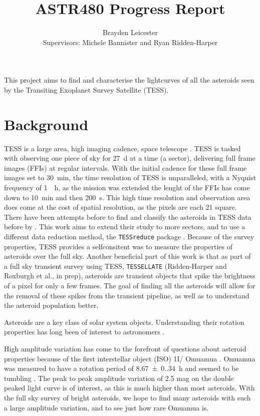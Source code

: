\documentclass[12pt]{article}
\title{ASTR480 Progress Report}
\author{Brayden Leicester \\[1ex]
\small{Supervisors: Michele Bannister and Ryan Ridden-Harper}
}
\DeclareRobustCommand{\okina}{%
  \raisebox{\dimexpr\fontcharht\font`A-\height}{%
    \scalebox{0.8}{`}%
  }%
}
\newcommand{\omuamua}{\okina Omuamua }
\begin{document}
\maketitle


This project aims to find and characterise the lightcurves of all the asteroids seen by the Transiting Exoplanet Survey Satellite (TESS). 
\section{Background}
TESS is a large area, high imaging cadence, space telescope  \citep{Ricker2014}. 
TESS is tasked with observing one piece of sky for \qty{27}{\day} at a time (a sector), delivering  full frame images (FFIs) at regular intervals. 
With the initial cadence for these full frame images set to \qty{30}{\minute}, the time resolution of TESS is unparalleled, with a Nyquist frequency of \qty{1}{\per\hour}, as the mission was extended the lenght of the FFIs has come down to \qty{10}{\minute} and then \qty{200}{\second}. 
This high time resolution and observation area does come at the cost of spatial resolution, as the pixels are each \qty{21}{\arcsec} square.
There have been attempts before to find and classify the asteroids in TESS data before by \citet{Pal2018, Pal2020}. This work aims to extend their study to more sectors, and to use a different data reduction method, the \texttt{TESSreduce} package \citep{Ridden-Harper2021}.
Because of the survey properties, TESS provides a selfconsitent was to measure the properties of asteroids over the full sky.   
Another beneficial part of this work is that as part of a full sky transient survey using TESS, \texttt{TESSELLATE} (Ridden-Harper and Roxburgh et al., in prep), asteroids are transient objects that spike the brightness of a pixel for only a few frames.
The goal of finding all the asteroids will allow for the removal of these spikes from the transient pipeline, as well as to understand the asteroid population better.  


Asteroids are a key class of solar system objects. 
Understanding their rotation properties has long been of interest to astronomers \citep[e.g.][]{Weidenschilling1981,Harris1994}.

High amplitude variation has come to the forefront of questions about asteroid properties because of the first interstellar object (ISO) 1I/\omuamua \citep[see][for a review]{Bannister2019}. 
\omuamua was measured to have a rotation period of \qty{8.67(0.34)}{\hour} \citep{Belton2018} and seemed to be tumbling \citep[e.g.][]{Drahus2018,Fraser2018}. 
The peak to peak amplitude variation of 2.5 mag %
on the double peaked light curve is of interest, as this is much higher than most asteroids. 
With the full sky survey of bright asteroids, we hope to find many asteroids with such a large amplitude variation, and to see just how rare \omuamua is.  
\end{document}
